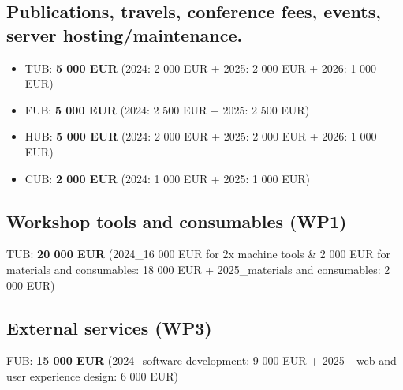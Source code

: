\documentclass[
  12pt,
  a4paper,
]{article}
\providecommand{\tightlist}{%
  \setlength{\itemsep}{0pt}\setlength{\parskip}{0pt}}
\begin{document}
\hypertarget{publications-travels-conference-fees-events-server-hostingmaintenance.}{%
\subsection{Publications, travels, conference fees, events, server
hosting/maintenance.}\label{publications-travels-conference-fees-events-server-hostingmaintenance.}}

\begin{itemize}
\tightlist
\item
  TUB: \textbf{5 000 EUR} (2024: 2 000 EUR + 2025: 2 000 EUR + 2026: 1
  000 EUR)
\item
  FUB: \textbf{5 000 EUR} (2024: 2 500 EUR + 2025: 2 500 EUR)
\item
  HUB: \textbf{5 000 EUR} (2024: 2 000 EUR + 2025: 2 000 EUR + 2026: 1
  000 EUR)
\item
  CUB: \textbf{2 000 EUR} (2024: 1 000 EUR + 2025: 1 000 EUR)
\end{itemize}

\hypertarget{workshop-tools-and-consumables-wp1}{%
\subsection{Workshop tools and consumables
(WP1)}\label{workshop-tools-and-consumables-wp1}}

TUB: \textbf{20 000 EUR} (2024\_16 000 EUR for 2x machine tools \& 2 000
EUR for materials and consumables: 18 000 EUR + 2025\_materials and
consumables: 2 000 EUR)

\hypertarget{external-services-wp3}{%
\subsection{External services (WP3)}\label{external-services-wp3}}

FUB: \textbf{15 000 EUR} (2024\_software development: 9 000 EUR + 2025\_
web and user experience design: 6 000 EUR)
\end{document}
